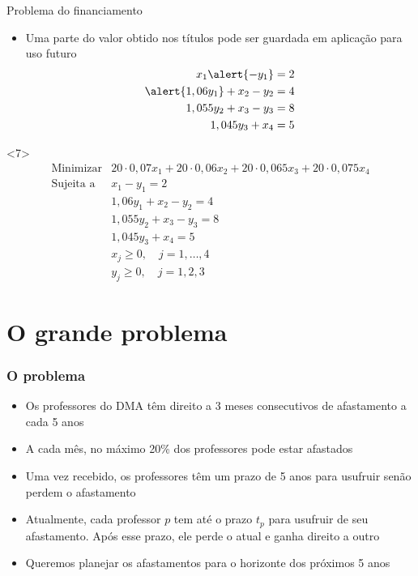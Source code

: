 \documentclass[10pt]{beamer}
\begin{document}
\begin{frame}{Problema do financiamento}
\begin{itemize}
  \item<only@6> Uma parte do valor obtido nos títulos pode ser
    guardada em aplicação para uso futuro
    \[
      \begin{aligned}
        x_1 \alert{- y_1} & = 2 \\
        \alert{1,06 y_1} + x_2 - y_2 & = 4 \\
        1,055 y_2 + x_3 - y_3 & = 8 \\
        1,045 y_3 + x_4 & = 5
      \end{aligned}
    \]
  \end{itemize}

  \begin{onlyenv}<7>
    \[
      \begin{array}{ll}
        \mbox{Minimizar} & 20 \cdot 0,07 x_1 + 20 \cdot 0,06 x_2 + 20 \cdot 0,065 x_3 + 20\cdot 0,075 x_4 \\
        \mbox{Sujeita a} &         x_1 - y_1 = 2 \\
                         & 1,06 y_1 + x_2 - y_2  = 4 \\
                         & 1,055 y_2 + x_3 - y_3  = 8 \\
                         & 1,045 y_3 + x_4 = 5 \\
                         & x_j \ge 0,\quad j = 1, \dots, 4 \\
                         & y_j \ge 0,\quad j = 1, 2, 3
      \end{array}
    \]
  \end{onlyenv}
  
\end{frame}

\section{O grande problema}

\begin{frame}
  \frametitle{O problema}

  \begin{itemize}
  \item Os professores do DMA têm direito a 3 meses consecutivos de
    afastamento a cada 5 anos
  \item A cada mês, no máximo 20\% dos professores pode estar
    afastados
  \item Uma vez recebido, os professores têm um prazo de 5 anos para
    usufruir senão perdem o afastamento
  \item Atualmente, cada professor $p$ tem até o prazo $t_p$ para
    usufruir de seu afastamento. Após esse prazo, ele perde o atual e
    ganha direito a outro
  \item Queremos planejar os afastamentos para o horizonte dos
    próximos 5 anos
  \end{itemize}
  
\end{frame}
\end{document}
